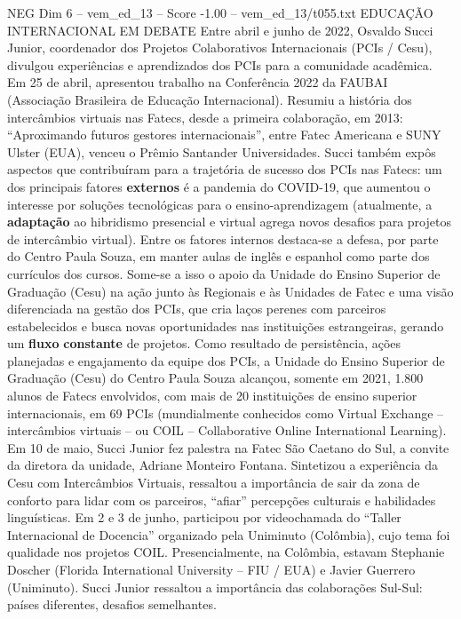 \begin{textsample}{NEG Dim 6 – vem\_ed\_13 – Score -1.00 – vem\_ed\_13/t055.txt}  \label{ex:f6_neg_044}
EDUCAÇÃO INTERNACIONAL EM DEBATE Entre abril e junho de 2022, Osvaldo Succi Junior, coordenador dos Projetos Colaborativos Internacionais (PCIs / Cesu), divulgou experiências e aprendizados dos PCIs para a comunidade acadêmica.
Em 25 de abril, apresentou trabalho na Conferência 2022 da FAUBAI (Associação Brasileira de Educação Internacional).
Resumiu a história dos intercâmbios virtuais nas Fatecs, desde a primeira colaboração, em 2013: “Aproximando futuros gestores internacionais”, entre Fatec Americana e SUNY Ulster (EUA), venceu o Prêmio Santander Universidades.
Succi também expôs aspectos que contribuíram para a trajetória de sucesso dos PCIs nas Fatecs: um dos principais fatores \textbf{externos} é a pandemia do COVID-19, que aumentou o interesse por soluções tecnológicas para o ensino-aprendizagem (atualmente, a \textbf{adaptação} ao hibridismo presencial e virtual agrega novos desafios para projetos de intercâmbio virtual).
Entre os fatores internos destaca-se a defesa, por parte do Centro Paula Souza, em manter aulas de inglês e espanhol como parte dos currículos dos cursos.
Some-se a isso o apoio da Unidade do Ensino Superior de Graduação (Cesu) na ação junto às Regionais e às Unidades de Fatec e uma visão diferenciada na gestão dos PCIs, que cria laços perenes com parceiros estabelecidos e busca novas oportunidades nas instituições estrangeiras, gerando um \textbf{fluxo} \textbf{constante} de projetos.
Como resultado de persistência, ações planejadas e engajamento da equipe dos PCIs, a Unidade do Ensino Superior de Graduação (Cesu) do Centro Paula Souza alcançou, somente em 2021, 1.800 alunos de Fatecs envolvidos, com mais de 20 instituições de ensino superior internacionais, em 69 PCIs (mundialmente conhecidos como Virtual Exchange – intercâmbios virtuais – ou COIL – Collaborative Online International Learning).
Em 10 de maio, Succi Junior fez palestra na Fatec São Caetano do Sul, a convite da diretora da unidade, Adriane Monteiro Fontana.
Sintetizou a experiência da Cesu com Intercâmbios Virtuais, ressaltou a importância de sair da zona de conforto para lidar com os parceiros, “afiar” percepções culturais e habilidades linguísticas.
Em 2 e 3 de junho, participou por videochamada do “Taller Internacional de Docencia” organizado pela Uniminuto (Colômbia), cujo tema foi qualidade nos projetos COIL.
Presencialmente, na Colômbia, estavam Stephanie Doscher (Florida International University – FIU / EUA) e Javier Guerrero (Uniminuto).
Succi Junior ressaltou a importância das colaborações Sul-Sul: países diferentes, desafios semelhantes.

\end{textsample}
